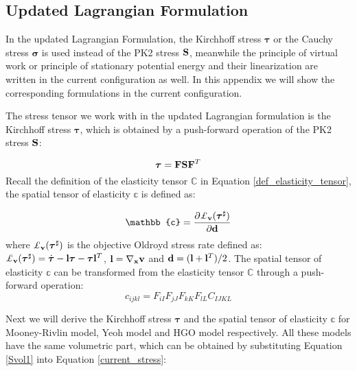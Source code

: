 \begin{appendices}
\section{Updated Lagrangian Formulation}
In the updated Lagrangian Formulation, the Kirchhoff stress $\boldsymbol{\tau}$ or the Cauchy stress $\boldsymbol{\sigma}$ is used instead of the PK2 stress $\bold{S}$, meanwhile the principle of virtual work or principle of stationary potential energy and their linearization are written in the current configuration as well. In this appendix we will show the corresponding formulations in the current configuration.

%
The stress tensor we work with in the updated Lagrangian formulation is the Kirchhoff stress $\boldsymbol{\tau}$, which is obtained by a push-forward operation of the PK2 stress $\bold{S}$:

\begin{equation}
\boldsymbol{\tau} = \bold{F}\bold{S}{\bold{F}}^T \label{current_stress}
\end{equation}
Recall the definition of the elasticity tensor $\mathbb{C}$ in Equation \ref{def_elasticity_tensor}, the spatial tensor of elasticity $\mathbb{c}$ is defined as:

\begin{equation}
\mathbb{c} = \frac{\partial{ \pounds_{\bold{v}}({\boldsymbol{\tau}}^{\sharp}) } }{\partial{ \bold{d} }}
\end{equation} 
where $\pounds_{\bold{v}}({\boldsymbol{\tau}}^{\sharp})$ is the objective Oldroyd stress rate defined as: $\pounds_{\bold{v}}({\boldsymbol{\tau}}^{\sharp}) = \dot{\boldsymbol{\tau}} - \bold{l}\boldsymbol{\tau} - \boldsymbol{\tau}\bold{l}^T$, $\bold{l} = \nabla_{\bold{x}}\bold{v}$ and $\bold{d} = (\bold{l} + {\bold{l}}^T)/2$. 
The spatial tensor of elasticity $\mathbb{c}$ can be transformed from the elasticity tensor $\mathbb{C}$ through a push-forward operation:
\begin{equation}
c_{ijkl} = F_{iI}F_{jJ}F_{kK}F_{lL}C_{IJKL} \label{current_elasticity}
\end{equation}

Next we will derive the Kirchhoff stress $\boldsymbol{\tau}$ and the spatial tensor of elasticity $\mathbb{c}$ for Mooney-Rivlin model, Yeoh model and HGO model respectively. All these models have the same volumetric part, which can be obtained by substituting Equation \ref{Svol1} into Equation \ref{current_stress}:


\end{appendices}
